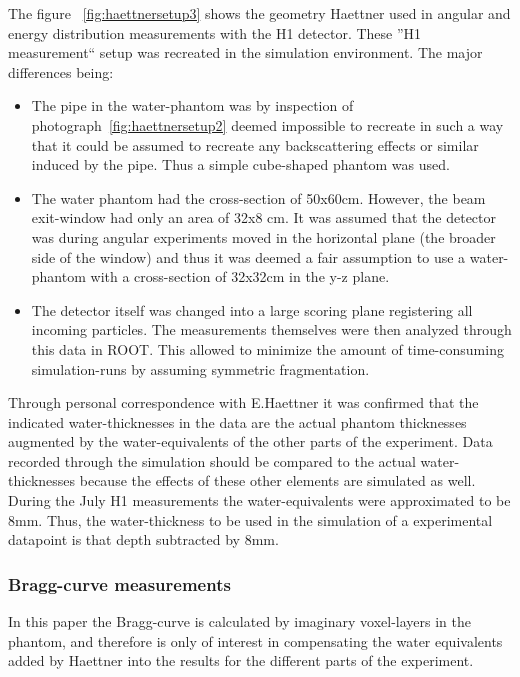 The figure ~\ref{fig:haettnersetup3} shows the geometry Haettner used in angular and energy distribution measurements with the H1 detector. These ''H1 measurement`` setup was recreated in the simulation environment. The major differences being:
\begin{itemize}
\item The pipe in the water-phantom was by inspection of photograph~\ref{fig:haettnersetup2} deemed impossible to recreate in such a way that it could be assumed to recreate any backscattering effects or similar induced by the pipe. Thus a simple cube-shaped phantom was used.
\item The water phantom had the cross-section of 50x60cm. However, the beam exit-window had only an area of 32x8 cm. It was assumed that the detector was during angular experiments moved in the horizontal plane (the broader side of the window) and thus it was deemed a fair assumption to use a water-phantom with a cross-section of 32x32cm in the y-z plane. 
\item The detector itself was changed into a large scoring plane registering all incoming particles. The measurements themselves were then analyzed through this data in ROOT. This allowed to minimize the amount of time-consuming simulation-runs by assuming symmetric fragmentation.
\end{itemize}

Through personal correspondence with E.Haettner it was confirmed that the indicated water-thicknesses in the data are the actual phantom thicknesses augmented by the water-equivalents of the other parts of the experiment. Data recorded through the simulation should be compared to the actual water-thicknesses because the effects of these other elements are simulated as well. During the July H1 measurements the water-equivalents were approximated to be 8mm. Thus, the water-thickness to be used in the simulation of a experimental datapoint is that depth subtracted by 8mm. %

\subsubsection{Bragg-curve measurements}
In this paper the Bragg-curve is calculated by imaginary voxel-layers in the phantom, and therefore is only of interest in compensating the water equivalents added by Haettner into the results for the different parts of the experiment.

